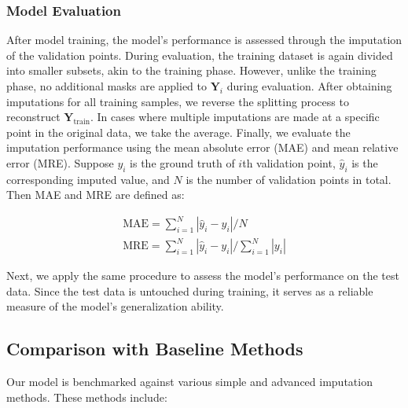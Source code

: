 \documentclass[review]{elsarticle}
\begin{document}
\subsubsection*{Model Evaluation}
After model training, the model's performance is assessed through the imputation of the validation points. During evaluation, the training dataset is again divided into smaller subsets, akin to the training phase. However, unlike the training phase, no additional masks are applied to $\boldsymbol{Y}_i$ during evaluation. After obtaining imputations for all training samples, we reverse the splitting process to reconstruct $\boldsymbol{Y}_{\text{train}}$. In cases where multiple imputations are made at a specific point in the original data, we take the average. Finally, we evaluate the imputation performance using the mean absolute error (MAE) and mean relative error (MRE). Suppose $y_i$ is the ground truth of $i$th validation point, $\hat{y}_i$ is the corresponding imputed value, and $N$ is the number of validation points in total. Then MAE and MRE are defined as:


\begin{align}
		\text{MAE}=\sum_{i=1}^N |\hat{y}_i - y_i|/N\\
		\text{MRE}=\sum_{i=1}^N|\hat{y}_i-y_i|/{\sum_{i=1}^N|y_i|}
\end{align}


Next, we apply the same procedure to assess the model's performance on the test data. Since the test data is untouched during training, it serves as a reliable measure of the model's generalization ability.



\subsection{Comparison with Baseline Methods}
Our model is benchmarked against various simple and advanced imputation methods. These methods include:
\end{document}
